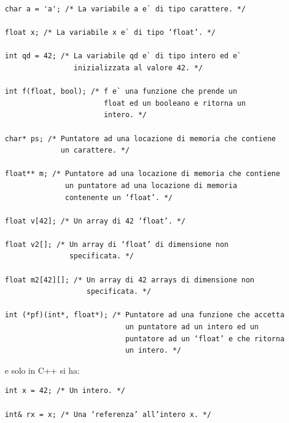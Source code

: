 \documentclass[a4paper,12pt, oneside]{book}
\begin{document}
\begin{verbatim}
char a = 'a'; /* La variabile a e` di tipo carattere. */

float x; /* La variabile x e` di tipo ‘float’. */

int qd = 42; /* La variabile qd e` di tipo intero ed e`
                inizializzata al valore 42. */

int f(float, bool); /* f e` una funzione che prende un
                       float ed un booleano e ritorna un
                       intero. */
                       
char* ps; /* Puntatore ad una locazione di memoria che contiene
             un carattere. */

float** m; /* Puntatore ad una locazione di memoria che contiene
              un puntatore ad una locazione di memoria
              contenente un ‘float’. */

float v[42]; /* Un array di 42 ‘float’. */

float v2[]; /* Un array di ‘float’ di dimensione non
               specificata. */
               
float m2[42][]; /* Un array di 42 arrays di dimensione non
                   specificata. */

int (*pf)(int*, float*); /* Puntatore ad una funzione che accetta
                            un puntatore ad un intero ed un
                            puntatore ad un ‘float’ e che ritorna
                            un intero. */
\end{verbatim}
e solo in C++ si ha:
\begin{verbatim}
int x = 42; /* Un intero. */

int& rx = x; /* Una ‘referenza’ all’intero x. */
\end{verbatim}
\end{document}
